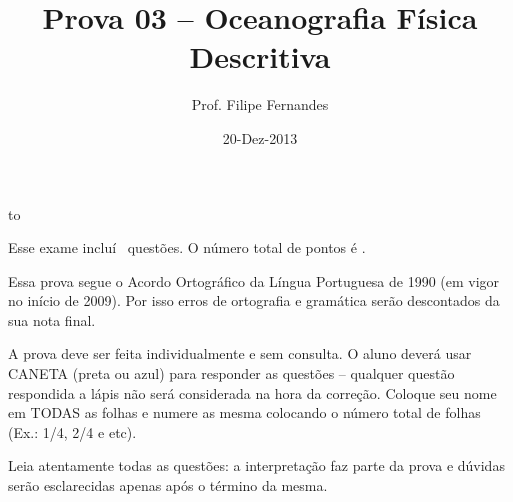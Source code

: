 \documentclass[letterpaper,portuguese,12pt,pdftex]{exam}
\title{Prova 03 -- Oceanografia Física Descritiva}
\author{Prof. Filipe Fernandes}
\date{20-Dez-2013}
\begin{document}
\maketitle
\doublespacing

\vspace{1cm}
\hbox to \textwidth{Nome e número de matrícula:\enspace\hrulefill}
\vspace{1cm}

\begin{minipage}{.8\textwidth}
Esse exame incluí \numquestions\ questões. O número total de pontos é \numpoints.
\vspace{1cm}

Essa prova segue o Acordo Ortográfico da Língua Portuguesa de 1990 (em vigor no
início de 2009).  Por isso erros de ortografia e gramática serão descontados da
sua nota final.

\vspace{1cm}

A prova deve ser feita individualmente e sem consulta.  O aluno deverá usar
CANETA (preta ou azul) para responder as questões – qualquer questão respondida
a lápis não será considerada na hora da correção.  Coloque seu nome em TODAS as
folhas e numere as mesma colocando o número total de folhas (Ex.: 1/4, 2/4 e
etc).

\vspace{1cm}

Leia atentamente todas as questões: a interpretação faz parte da prova e dúvidas
serão esclarecidas apenas após o término da mesma.

\end{minipage}

\clearpage
\end{document}
